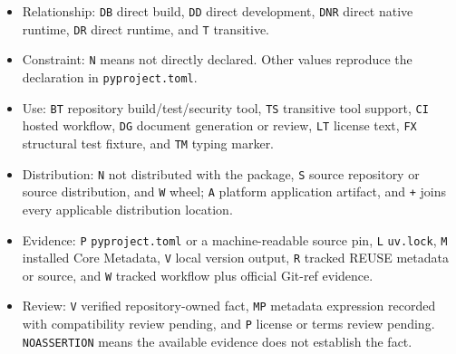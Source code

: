 \documentclass[
  letterpaper,
]{article}
\newcommand{\passthrough}[1]{#1}
\providecommand{\tightlist}{%
  \setlength{\itemsep}{0pt}\setlength{\parskip}{0pt}}
\begin{document}
\begin{itemize}
\tightlist
\item
  Relationship: \passthrough{\lstinline!DB!} direct build, \passthrough{\lstinline!DD!} direct development,
  \passthrough{\lstinline!DNR!} direct native runtime, \passthrough{\lstinline!DR!} direct runtime, and
  \passthrough{\lstinline!T!} transitive.
\item
  Constraint: \passthrough{\lstinline!N!} means not directly declared. Other values reproduce the declaration in
  \nolinkurl{pyproject.toml}.
\item
  Use: \passthrough{\lstinline!BT!} repository build/test/security tool, \passthrough{\lstinline!TS!} transitive tool
  support, \passthrough{\lstinline!CI!} hosted workflow, \passthrough{\lstinline!DG!} document generation or review,
  \passthrough{\lstinline!LT!} license text, \passthrough{\lstinline!FX!} structural test fixture, and
  \passthrough{\lstinline!TM!} typing marker.
\item
  Distribution: \passthrough{\lstinline!N!} not distributed with the package, \passthrough{\lstinline!S!} source
  repository or source distribution, and \passthrough{\lstinline!W!} wheel; \passthrough{\lstinline!A!} platform
  application artifact, and \passthrough{\lstinline!+!} joins every applicable distribution location.
\item
  Evidence: \passthrough{\lstinline!P!} \nolinkurl{pyproject.toml} or a machine-readable source pin,
  \passthrough{\lstinline!L!} \passthrough{\lstinline!uv.lock!}, \passthrough{\lstinline!M!} installed Core Metadata,
  \passthrough{\lstinline!V!} local version output, \passthrough{\lstinline!R!} tracked REUSE metadata or source, and
  \passthrough{\lstinline!W!} tracked workflow plus official Git-ref evidence.
\item
  Review: \passthrough{\lstinline!V!} verified repository-owned fact, \passthrough{\lstinline!MP!} metadata expression
  recorded with compatibility review pending, and \passthrough{\lstinline!P!} license or terms review pending.
  \nolinkurl{NOASSERTION} means the available evidence does not establish the fact.
\end{itemize}
\end{document}
